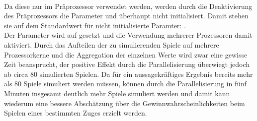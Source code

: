 \\Da diese nur im Präprozessor verwendet werden, werden durch die Deaktivierung des Präprozessors die Parameter  und  überhaupt nicht initialisiert. Damit stehen sie auf dem Standardwert für nicht initialisierte Paramter: .
\\Der Parameter  wird auf  gesetzt und die Verwendung mehrerer Prozessoren damit aktiviert. Durch das Aufteilen der zu simulierenden Spiele auf mehrere Prozessorkerne und die Aggregation der einzelnen Werte wird zwar eine gewisse Zeit beansprucht, der positive Effekt durch die Parallelisierung überwiegt jedoch ab circa 80 simulierten Spielen. Da für ein aussagekräftiges Ergebnis bereits mehr als 80 Spiele simuliert werden müssen, können durch die Parallelisierung in fünf Minuten insgesamt deutlich mehr Spiele simuliert werden und damit kann wiederum eine bessere Abschätzung über die Gewinnwahrscheinlichkeiten beim Spielen eines bestimmten Zuges erzielt werden.
\newpage
